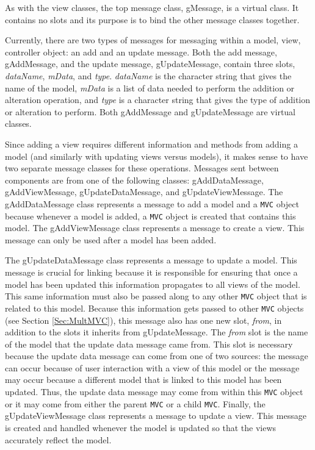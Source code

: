 \documentclass{article}[11pt]
\newcommand{\Robject}[1]{{\texttt{#1}}}
\newcommand{\Rslot}[1]{\textsl{#1}}
\newcommand{\Rclass}[1]{\textsf{#1}}
\begin{document}
As with the view classes, the top message class,
\Rclass{gMessage}, is a virtual class.  It contains no slots and its purpose
is to bind the other message classes together.

Currently, there are two types of messages for messaging within a
model, view, controller object: an add and an update message.  Both the add
message, \Rclass{gAddMessage}, and the update message, \Rclass{gUpdateMessage},
contain three slots, \Rslot{dataName}, \Rslot{mData}, and \Rslot{type}.
\Rslot{dataName} is the character string that gives the name of the model,
\Rslot{mData} is a list of data needed to perform the addition or alteration
operation, and \Rslot{type} is a character string that gives the type of
addition or alteration to perform.  Both \Rclass{gAddMessage} and
\Rclass{gUpdateMessage} are virtual classes. 

Since adding a view requires different information and methods from adding a
model (and similarly with updating views versus models), it makes sense to
have two separate message classes for these operations.  Messages
sent between components are from one of the following classes:
\Rclass{gAddDataMessage}, \Rclass{gAddViewMessage},
\Rclass{gUpdateDataMessage}, and \Rclass{gUpdateViewMessage}.  The
\Rclass{gAddDataMessage} class represents a message to add a model
and a \Robject{MVC} object because whenever a model is added, a
\Robject{MVC} object is created that contains this model.  The
\Rclass{gAddViewMessage} class represents a message to create a view.  This
message can only be used after a model has been added. 

The \Rclass{gUpdateDataMessage} class represents a message to update
a model.  This message is crucial for linking because it is
responsible for ensuring that once a model has been updated this
information propagates to all views of the model.  This
same information must also be passed along to any other \Robject{MVC} object
that is related to this model.  Because this
information gets passed to other \Robject{MVC} objects (see Section
\ref{Sec:MultMVC}), this message also has one new slot, \Rslot{from}, in
addition to the slots it inherits from \Rclass{gUpdateMessage}.  The
\Rslot{from} slot is the name of the model that the update data
message came from.  This slot is necessary because the update data message can
come from one of two sources: the message can occur because of user
interaction with a view of this model or the message may
occur because a different model that is
linked to this model has been updated.  Thus, the update data
message may come from within this \Robject{MVC} object or it may come from
either the parent \Robject{MVC} or a child \Robject{MVC}.  Finally, the
\Rclass{gUpdateViewMessage} class represents a message to update a
view.  This message is created and handled whenever the
model is updated so that the views accurately reflect the model. 
\end{document}
